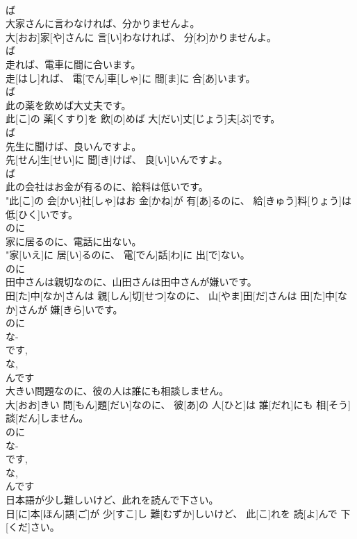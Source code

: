\documentclass[8pt]{extreport}
\begin{document}
\begin{CJK}{UTF8}{min}
\\	ば 
\\	大家さんに言わなければ、分かりませんよ。	
\\	大[おお]家[や]さんに 言[い]わなければ、 分[わ]かりませんよ。 
\\	ば 
\\	走れば、電車に間に合います。	
\\	走[はし]れば、 電[でん]車[しゃ]に 間[ま]に 合[あ]います。 
\\	ば 
\\	此の薬を飲めば大丈夫です。	
\\	此[こ]の 薬[くすり]を 飲[の]めば 大[だい]丈[じょう]夫[ぶ]です。 
\\	ば 
\\	先生に聞けば、良いんですよ。	
\\	先[せん]生[せい]に 聞[き]けば、 良[い]いんですよ。 
\\	ば 
\\	此の会社はお金が有るのに、給料は低いです。	
\\	"此[こ]の 会[かい]社[しゃ]はお 金[かね]が 有[あ]るのに、 給[きゅう]料[りょう]は 低[ひく]いです。 
\\	のに 
\\	家に居るのに、電話に出ない。	
\\	"家[いえ]に 居[い]るのに、 電[でん]話[わ]に 出[で]ない。 
\\	のに 
\\	田中さんは親切なのに、山田さんは田中さんが嫌いです。	
\\	田[た]中[なか]さんは 親[しん]切[せつ]なのに、 山[やま]田[だ]さんは 田[た]中[なか]さんが 嫌[きら]いです。 
\\	のに 
\\	な-
\\	です, 
\\	な, 
\\	んです 
\\	大きい問題なのに、彼の人は誰にも相談しません。	
\\	大[おお]きい 問[もん]題[だい]なのに、 彼[あ]の 人[ひと]は 誰[だれ]にも 相[そう]談[だん]しません。 
\\	のに 
\\	な-
\\	です, 
\\	な, 
\\	んです 
\\	日本語が少し難しいけど、此れを読んで下さい。	
\\	日[に]本[ほん]語[ご]が 少[すこ]し 難[むずか]しいけど、 此[こ]れを 読[よ]んで 下[くだ]さい。

\end{CJK}
\end{document}
